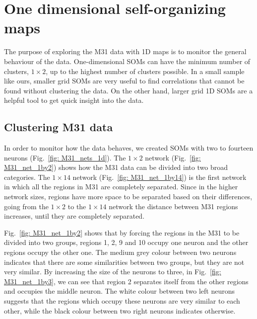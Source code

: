 \section{One dimensional self-organizing maps}
    \label{Sec: 1d_cluster}
    The purpose of  exploring the M31 data with 1D maps is to monitor the general behaviour of the data. 
    One-dimensional SOMs can have the minimum number of clusters, $1\times2$, up to the highest number of clusters possible.
    In a small sample like ours, smaller grid SOMs are very useful to find correlations that cannot be found without  clustering the data.
    On the other hand, larger grid 1D SOMs are a helpful tool to get quick insight into the data.

    \subsection{Clustering M31 data}%

        In order to monitor how the data behaves, we created SOMs with two to fourteen neurons (Fig.~\ref{fig: M31_nets_1d}).
        The $1\times2$ network (Fig.~\ref{fig: M31_net_1by2}) shows how the M31 data can be divided into two broad categories.
        The $1\times14$ network (Fig.~\ref{fig: M31_net_1by14}) is the first network in which all the regions in M31 are completely separated.
        Since in the higher network sizes, regions have more space to be separated based on their differences,  going from the $1\times2$ to the $1\times14$ network the distance between M31 regions increases, until they are completely separated. 
        
      Fig.~\ref{fig: M31_net_1by2} shows that by forcing the regions in the M31 to be divided into two groups, regions 1, 2, 9 and 10 occupy one neuron and the other regions occupy the other one.
        The medium grey colour between two neurons indicates that there are some similarities between two groups, but they are not very similar. 
        By increasing the size of the neurons to three, in Fig.~\ref{fig: M31_net_1by3}, we can see that region 2 separates itself from the other regions and occupies the middle neuron.
        The white colour between two left neurons suggests that the regions which occupy these neurons are very similar to each other, while the black colour between two right neurons indicates otherwise.
        
